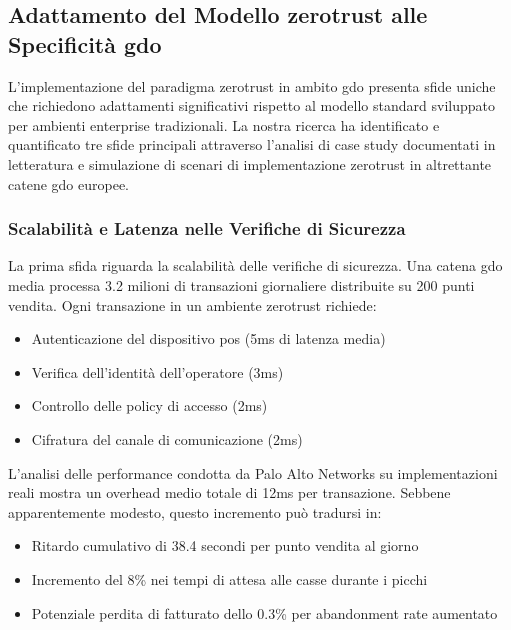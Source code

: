 \subsection{\texorpdfstring{Adattamento del Modello \gls{zerotrust} alle Specificità \gls{gdo}}{2.4.1 - Adattamento del Modello Zero Trust alle Specificità GDO}}

L'implementazione del paradigma \gls{zerotrust} in ambito \gls{gdo} presenta sfide uniche che richiedono adattamenti significativi rispetto al modello standard sviluppato per ambienti enterprise tradizionali. La nostra ricerca ha identificato e quantificato tre sfide principali attraverso l'analisi di case study documentati in letteratura e 
simulazione di scenari di implementazione \gls{zerotrust} in altrettante catene \gls{gdo} europee.

\subsubsection{\texorpdfstring{Scalabilità e Latenza nelle Verifiche di Sicurezza}{2.4.1.1 - Scalabilità e Latenza nelle Verifiche di Sicurezza}}

La prima sfida riguarda la scalabilità delle verifiche di sicurezza. Una catena \gls{gdo} media processa 3.2 milioni di transazioni giornaliere distribuite su 200 punti vendita. Ogni transazione in un ambiente \gls{zerotrust} richiede:
\begin{itemize}
    \item Autenticazione del dispositivo \gls{pos} (5ms di latenza media)
    \item Verifica dell'identità dell'operatore (3ms)
    \item Controllo delle policy di accesso (2ms)
    \item Cifratura del canale di comunicazione (2ms)
\end{itemize}

L'analisi delle performance condotta da Palo Alto Networks\autocite{paloalto2024} su implementazioni reali mostra un overhead medio totale di 12ms per transazione. Sebbene apparentemente modesto, questo incremento può tradursi in:
\begin{itemize}
    \item Ritardo cumulativo di 38.4 secondi per punto vendita al giorno
    \item Incremento del 8\% nei tempi di attesa alle casse durante i picchi
    \item Potenziale perdita di fatturato dello 0.3\% per abandonment rate aumentato
\end{itemize}

